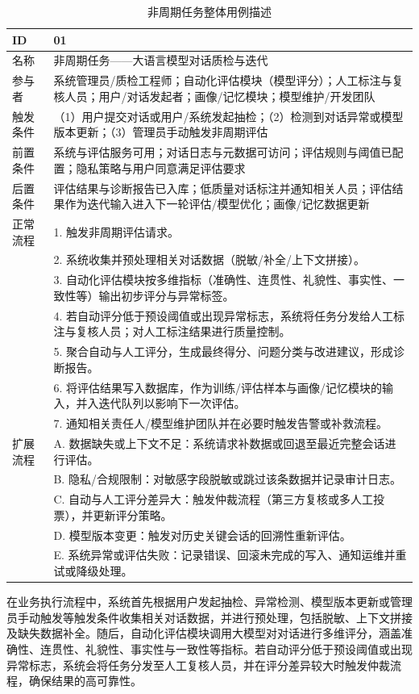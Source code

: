 \begin{table}[h]
\centering
\caption{非周期任务整体用例描述}
\label{tab:nonperiodic-usecase}
{\renewcommand{\arraystretch}{1.2}
\begin{tabular}{p{3cm} p{11cm}}
\hline
ID & 01 \\ \hline
名称 & 非周期任务——大语言模型对话质检与迭代 \\ \hline
参与者 & 系统管理员/质检工程师；自动化评估模块（模型评分）；人工标注与复核人员；用户/对话发起者；画像/记忆模块；模型维护/开发团队 \\ \hline
触发条件 & （1）用户提交对话或用户/系统发起抽检；（2）检测到对话异常或模型版本更新；（3）管理员手动触发非周期评估 \\ \hline
前置条件 & 系统与评估服务可用；对话日志与元数据可访问；评估规则与阈值已配置；隐私策略与用户同意满足评估要求 \\ \hline
后置条件 & 评估结果与诊断报告已入库；低质量对话标注并通知相关人员；评估结果作为迭代输入进入下一轮评估/模型优化；画像/记忆数据更新 \\ \hline
正常流程 & 1. 触发非周期评估请求。\\
 & 2. 系统收集并预处理相关对话数据（脱敏/补全/上下文拼接）。\\
 & 3. 自动化评估模块按多维指标（准确性、连贯性、礼貌性、事实性、一致性等）输出初步评分与异常标签。\\
 & 4. 若自动评分低于预设阈值或出现异常标志，系统将任务分发给人工标注与复核人员；对人工标注结果进行质量控制。\\
 & 5. 聚合自动与人工评分，生成最终得分、问题分类与改进建议，形成诊断报告。\\
 & 6. 将评估结果写入数据库，作为训练/评估样本与画像/记忆模块的输入，并入迭代队列以影响下一次评估。\\
 & 7. 通知相关责任人/模型维护团队并在必要时触发告警或补救流程。 \\ \hline
扩展流程 & A. 数据缺失或上下文不足：系统请求补数据或回退至最近完整会话进行评估。\\
 & B. 隐私/合规限制：对敏感字段脱敏或跳过该条数据并记录审计日志。\\
 & C. 自动与人工评分差异大：触发仲裁流程（第三方复核或多人工投票），并更新评分策略。\\
 & D. 模型版本变更：触发对历史关键会话的回溯性重新评估。\\
 & E. 系统异常或评估失败：记录错误、回滚未完成的写入、通知运维并重试或降级处理。 \\ \hline
\end{tabular}
}
\end{table}
在业务执行流程中，系统首先根据用户发起抽检、异常检测、模型版本更新或管理员手动触发等触发条件收集相关对话数据，并进行预处理，包括脱敏、上下文拼接及缺失数据补全。随后，自动化评估模块调用大模型对对话进行多维评分，涵盖准确性、连贯性、礼貌性、事实性与一致性等指标。若自动评分低于预设阈值或出现异常标志，系统会将任务分发至人工复核人员，并在评分差异较大时触发仲裁流程，确保结果的高可靠性。

